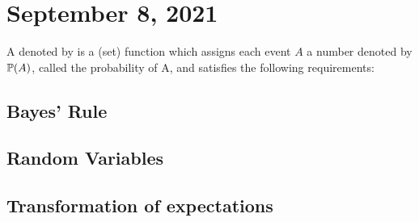 \section{September 8, 2021}
\begin{definition}
    A  denoted by \PP is a (set) function which assigns each event $A$ a number denoted by $\mathbb P(A)$, called the probability of A, and satisfies the following requirements:
    
\end{definition}
\subsection{Bayes' Rule}
\subsection{Random Variables}
\subsection{Transformation of expectations}